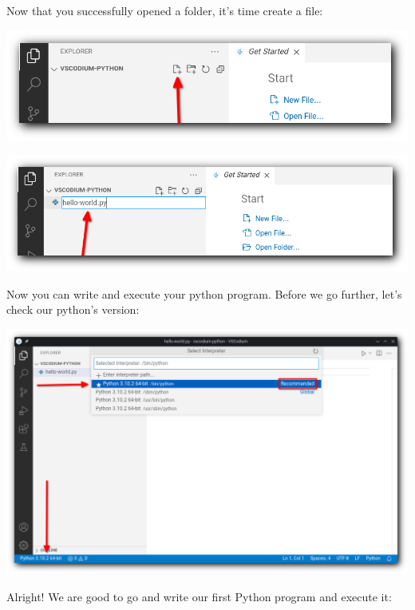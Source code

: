 \documentclass[12pt,a4paper]{article}
\begin{document}
Now that you successfully opened a folder, it's time create a file:

\begin{center}
	\includegraphics[width=.8\textwidth]{shots/installation/vscodium-folder04.png}

	\includegraphics[width=.8\textwidth]{shots/installation/vscodium-folder05.png}
\end{center}

Now you can write and execute your python program.
Before we go further, let's check our python's version:

\begin{center}
	\includegraphics[width=.8\textwidth]{shots/installation/vscodium-python-version.png}
\end{center}


Alright! We are good to go and write our first Python program
and execute it:
\end{document}
